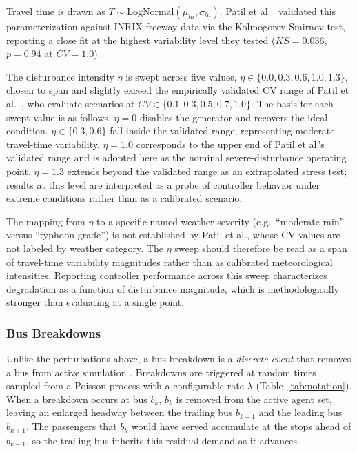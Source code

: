 Travel time is drawn as $T \sim \text{LogNormal}(\mu_{ln}, \sigma_{ln})$. Patil et al.~\cite{Patil2025Conformal} validated this parameterization against INRIX freeway data via the Kolmogorov-Smirnov test, reporting a close fit at the highest variability level they tested ($KS = 0.036$, $p = 0.94$ at $CV = 1.0$).

The disturbance intensity $\eta$ is swept across five values, $\eta \in \{0.0, 0.3, 0.6, 1.0, 1.3\}$, chosen to span and slightly exceed the empirically validated CV range of Patil et al.~\cite{Patil2025Conformal}, who evaluate scenarios at $CV \in \{0.1, 0.3, 0.5, 0.7, 1.0\}$. The basis for each swept value is as follows. $\eta = 0$ disables the generator and recovers the ideal condition. $\eta \in \{0.3, 0.6\}$ fall inside the validated range, representing moderate travel-time variability. $\eta = 1.0$ corresponds to the upper end of Patil et al.'s validated range and is adopted here as the nominal severe-disturbance operating point. $\eta = 1.3$ extends beyond the validated range as an extrapolated stress test; results at this level are interpreted as a probe of controller behavior under extreme conditions rather than as a calibrated scenario.

The mapping from $\eta$ to a specific named weather severity (e.g.\ ``moderate rain'' versus ``typhoon-grade'') is not established by Patil et al., whose CV values are not labeled by weather category. The $\eta$ sweep should therefore be read as a span of travel-time variability magnitudes rather than as calibrated meteorological intensities. Reporting controller performance across this sweep characterizes degradation as a function of disturbance magnitude, which is methodologically stronger than evaluating at a single point.

\subsubsection{Bus Breakdowns}

Unlike the perturbations above, a bus breakdown is a \textit{discrete event} that removes a bus from active simulation \cite{Cao2022Train,Shi2022DistDRL}. Breakdowns are triggered at random times sampled from a Poisson process with a configurable rate $\lambda$ (Table~\ref{tab:notation}). When a breakdown occurs at bus $b_k$, $b_k$ is removed from the active agent set, leaving an enlarged headway between the trailing bus $b_{k-1}$ and the leading bus $b_{k+1}$. The passengers that $b_k$ would have served accumulate at the stops ahead of $b_{k-1}$, so the trailing bus inherits this residual demand as it advances.

